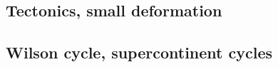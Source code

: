 \cite{nigm10}

\subsection*{Tectonics, small deformation}

\cite{ilma93}

\subsection*{Wilson cycle, supercontinent cycles}

\cite{zhzl07}
\cite{zhzm09}





